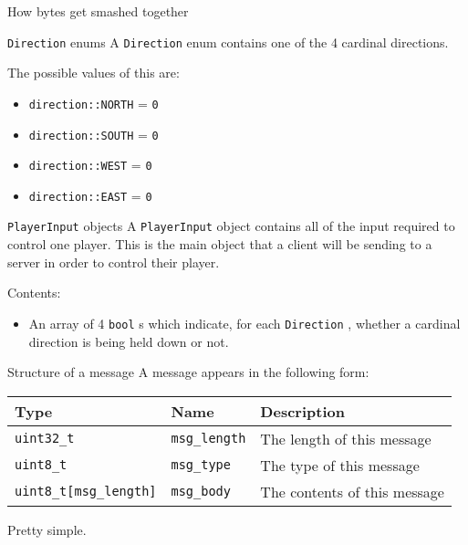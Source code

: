 \documentclass[a4paper,draft]{article}
\begin{document}
\begin{section}{How bytes get smashed together}
  \begin{subsection}{\texttt{Direction} enums}
    A \texttt{Direction} enum contains one of the 4 cardinal directions.

    The possible values of this are:

    \begin{itemize}
      \item \texttt{direction::NORTH} = \texttt{0}
      \item \texttt{direction::SOUTH} = \texttt{0}
      \item \texttt{direction::WEST} = \texttt{0}
      \item \texttt{direction::EAST} = \texttt{0}
    \end{itemize}
  \end{subsection}

  \begin{subsection}{\texttt{PlayerInput} objects}
    A \texttt{PlayerInput} object contains all of the input required to control one player.
    This is the main object that a client will be sending to a server in order to control their player.

    Contents:

    \begin{itemize}
      \item An array of 4 \texttt{bool} s which indicate, for each \texttt{Direction} , whether a cardinal direction is being held down or not.
    \end{itemize}
  \end{subsection}
\end{section}

\begin{section}{Structure of a message}
  A message appears in the following form:

  \begin{tabular}{lll}
    \hline
    Type & Name & Description \\
    \hline
    \texttt{uint32\_t} & \texttt{msg\_length} & The length of this message \\
    \texttt{uint8\_t} & \texttt{msg\_type} & The type of this message \\
    \texttt{uint8\_t[msg\_length]} & \texttt{msg\_body} & The contents of this message \\
    \hline
  \end{tabular}

  Pretty simple.
\end{section}
\end{document}
